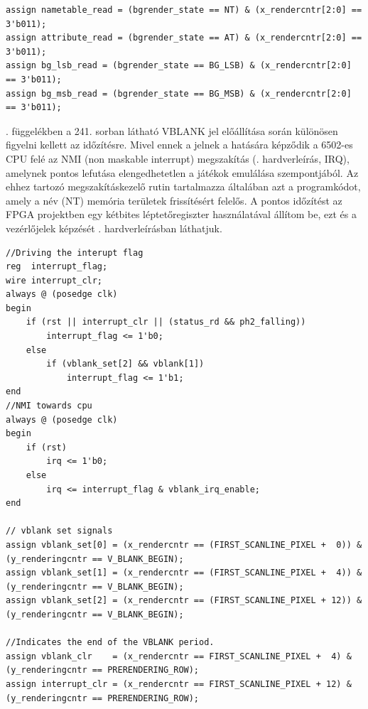 \begin{lstlisting}[caption={Az állapotgép alapján az adatok mentét vezérlőjelek}, label={code:saving-from-PPU Databus}, style=prettyverilog]
assign nametable_read = (bgrender_state == NT) & (x_rendercntr[2:0] == 3'b011);
assign attribute_read = (bgrender_state == AT) & (x_rendercntr[2:0] == 3'b011);
assign bg_lsb_read = (bgrender_state == BG_LSB) & (x_rendercntr[2:0] == 3'b011);
assign bg_msb_read = (bgrender_state == BG_MSB) & (x_rendercntr[2:0] == 3'b011);\end{lstlisting}
	
	. függelékben a 241. sorban látható VBLANK jel előállítása során különösen figyelni kellett az időzítésre. Mivel ennek a jelnek a hatására képződik a 6502-es CPU felé az NMI (non maskable interrupt) megszakítás (. hardverleírás, IRQ), amelynek pontos lefutása elengedhetetlen a játékok emulálása szempontjából. Az ehhez tartozó megszakításkezelő rutin tartalmazza általában azt a programkódot, amely a név (NT) memória területek frissítésért felelős. A pontos időzítést az FPGA projektben egy kétbites léptetőregiszter használatával állítom be, ezt és a vezérlőjelek képzését . hardverleírásban láthatjuk.       
		
\begin{lstlisting}[caption={VBLANK vezérlőjelek képzése és az NMI (IRQ) jel előállítása}, label={code:vblank-set}, style=prettyverilog]
//Driving the interupt flag
reg  interrupt_flag;
wire interrupt_clr;
always @ (posedge clk) 
begin
	if (rst || interrupt_clr || (status_rd && ph2_falling))
		interrupt_flag <= 1'b0;
	else
		if (vblank_set[2] && vblank[1])
			interrupt_flag <= 1'b1;
end
//NMI towards cpu
always @ (posedge clk) 
begin
	if (rst)
		irq <= 1'b0;
	else
		irq <= interrupt_flag & vblank_irq_enable; 
end
	
// vblank set signals
assign vblank_set[0] = (x_rendercntr == (FIRST_SCANLINE_PIXEL +  0)) & (y_renderingcntr == V_BLANK_BEGIN);
assign vblank_set[1] = (x_rendercntr == (FIRST_SCANLINE_PIXEL +  4)) & (y_renderingcntr == V_BLANK_BEGIN);
assign vblank_set[2] = (x_rendercntr == (FIRST_SCANLINE_PIXEL + 12)) & (y_renderingcntr == V_BLANK_BEGIN);

//Indicates the end of the VBLANK period.
assign vblank_clr    = (x_rendercntr == FIRST_SCANLINE_PIXEL +  4) & (y_renderingcntr == PRERENDERING_ROW);
assign interrupt_clr = (x_rendercntr == FIRST_SCANLINE_PIXEL + 12) & (y_renderingcntr == PRERENDERING_ROW);\end{lstlisting}
	

